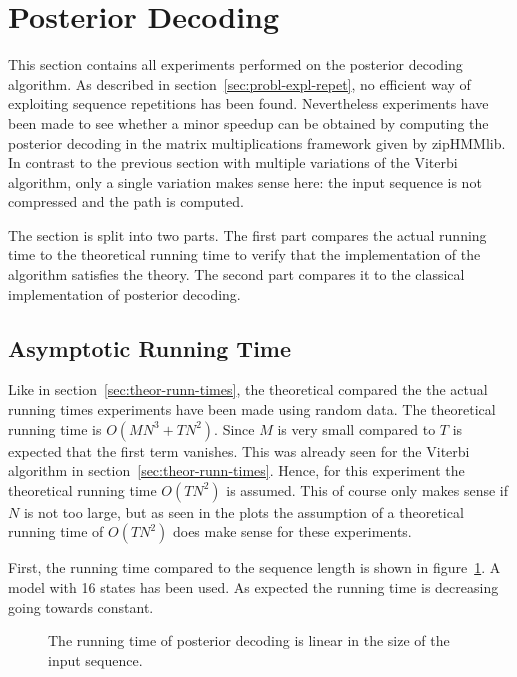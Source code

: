 \section{Posterior Decoding}

This section contains all experiments performed on the posterior decoding
algorithm. As described in section~\ref{sec:probl-expl-repet}, no efficient way
of exploiting sequence repetitions has been found. Nevertheless experiments
have been made to see whether a minor speedup can be obtained by computing the
posterior decoding in the matrix multiplications framework given by
zipHMMlib. In contrast to the previous section with multiple variations of the
Viterbi algorithm, only a single variation makes sense here: the input sequence
is not compressed and the path is computed.

The section is split into two parts. The first part compares the actual
running time to the theoretical running time to verify that the implementation
of the algorithm satisfies the theory. The second part compares it to the
classical implementation of posterior decoding.

\subsection{Asymptotic Running Time}
\label{sec:asympt-runn-time}

Like in section~\ref{sec:theor-runn-times}, the theoretical compared the the
actual running times experiments have been made using random data. The
theoretical running time is $O(M N^3 + TN^2)$. Since $M$ is very small compared
to $T$ is expected that the first term vanishes. This was already seen for the
Viterbi algorithm in section~\ref{sec:theor-runn-times}. Hence, for this
experiment the theoretical running time $O(TN^2)$ is assumed. This of course
only makes sense if $N$ is not too large, but as seen in the plots the
assumption of a theoretical running time of $O(TN^2)$ does make sense for these
experiments.

First, the running time compared to the sequence length is shown in
figure~\ref{fig:posterior_T}. A model with 16 states has been used. As expected
the running time is decreasing going towards constant.

\begin{figure}
  \centering
  
  \caption{The running time of posterior decoding is linear in the size of the
    input sequence.}
  \label{fig:posterior_T}
\end{figure}

